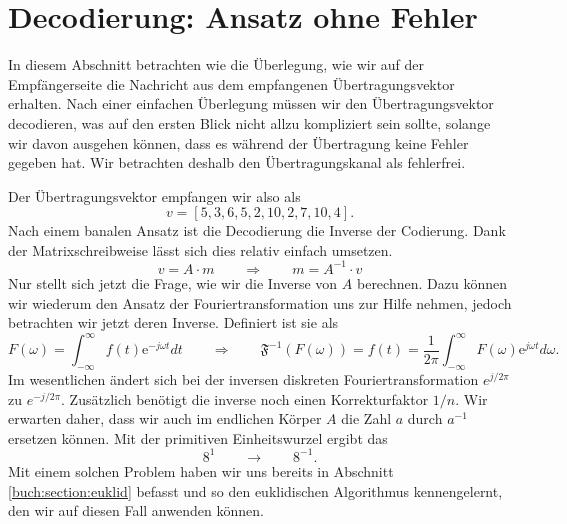 %
%
%
\section{Decodierung: Ansatz ohne Fehler
\label{reedsolomon:section:decohnefehler}}

In diesem Abschnitt betrachten wie die Überlegung, wie wir auf der Empfängerseite die Nachricht aus dem empfangenen Übertragungsvektor erhalten. Nach einer einfachen Überlegung müssen wir den Übertragungsvektor decodieren, was auf den ersten Blick nicht allzu kompliziert sein sollte, solange wir davon ausgehen können, dass es während der Übertragung keine Fehler gegeben hat. Wir betrachten deshalb den Übertragungskanal als fehlerfrei.

Der Übertragungsvektor empfangen wir also als
\[
v = [5,3,6,5,2,10,2,7,10,4].
\]
Nach einem banalen Ansatz ist die Decodierung die Inverse der Codierung. Dank der Matrixschreibweise lässt sich dies relativ einfach umsetzen.
\[
v = A \cdot m \qquad \Rightarrow \qquad m = A^{-1} \cdot v
\]
Nur stellt sich jetzt die Frage, wie wir die Inverse von $A$ berechnen.
Dazu können wir wiederum den Ansatz der Fouriertransformation uns zur Hilfe nehmen,
jedoch betrachten wir jetzt deren Inverse.
Definiert ist sie als
\[
F(\omega) = \int_{-\infty}^{\infty} f(t) \mathrm{e}^{-j\omega t} dt \qquad \Rightarrow \qquad \mathfrak{F}^{-1}(F(\omega)) = f(t) = \frac{1}{2 \pi} \int_{-\infty}^{\infty} F(\omega) \mathrm{e}^{j \omega t} d\omega.
\]
Im wesentlichen ändert sich bei der inversen diskreten Fouriertransformation $e^{j/2\pi}$ zu $e^{-j/2\pi}$. Zusätzlich benötigt die inverse noch einen Korrekturfaktor $1/n$. Wir erwarten daher, dass wir auch im endlichen Körper $A$ die Zahl $a$ durch $a^{-1}$ ersetzen können. Mit der primitiven Einheitswurzel ergibt das 
\[
8^1 \qquad \rightarrow \qquad 8^{-1}.
\]
Mit einem solchen Problem haben wir uns bereits in Abschnitt \ref{buch:section:euklid} befasst und so den euklidischen Algorithmus kennengelernt, den wir auf diesen Fall anwenden können.


